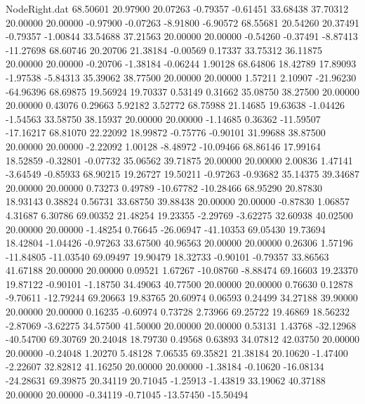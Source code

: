 \begin{filecontents}{NodeRight.dat}
  68.50601   20.97900   20.07263    -0.79357   -0.61451   33.68438   37.70312   20.00000   20.00000   -0.97900   -0.07263   -8.91800   -6.90572
  68.55681   20.54260   20.37491    -0.79357   -1.00844   33.54688   37.21563   20.00000   20.00000   -0.54260   -0.37491   -8.87413  -11.27698
  68.60746   20.20706   21.38184    -0.00569    0.17337   33.75312   36.11875   20.00000   20.00000   -0.20706   -1.38184   -0.06244    1.90128
  68.64806   18.42789   17.89093    -1.97538   -5.84313   35.39062   38.77500   20.00000   20.00000    1.57211    2.10907  -21.96230  -64.96396
  68.69875   19.56924   19.70337     0.53149    0.31662   35.08750   38.27500   20.00000   20.00000    0.43076    0.29663    5.92182    3.52772
  68.75988   21.14685   19.63638    -1.04426   -1.54563   33.58750   38.15937   20.00000   20.00000   -1.14685    0.36362  -11.59507  -17.16217
  68.81070   22.22092   18.99872    -0.75776   -0.90101   31.99688   38.87500   20.00000   20.00000   -2.22092    1.00128   -8.48972  -10.09466
  68.86146   17.99164   18.52859    -0.32801   -0.07732   35.06562   39.71875   20.00000   20.00000    2.00836    1.47141   -3.64549   -0.85933
  68.90215   19.26727   19.50211    -0.97263   -0.93682   35.14375   39.34687   20.00000   20.00000    0.73273    0.49789  -10.67782  -10.28466
  68.95290   20.87830   18.93143     0.38824    0.56731   33.68750   39.88438   20.00000   20.00000   -0.87830    1.06857    4.31687    6.30786
  69.00352   21.48254   19.23355    -2.29769   -3.62275   32.60938   40.02500   20.00000   20.00000   -1.48254    0.76645  -26.06947  -41.10353
  69.05430   19.73694   18.42804    -1.04426   -0.97263   33.67500   40.96563   20.00000   20.00000    0.26306    1.57196  -11.84805  -11.03540
  69.09497   19.90479   18.32733    -0.90101   -0.79357   33.86563   41.67188   20.00000   20.00000    0.09521    1.67267  -10.08760   -8.88474
  69.16603   19.23370   19.87122    -0.90101   -1.18750   34.49063   40.77500   20.00000   20.00000    0.76630    0.12878   -9.70611  -12.79244
  69.20663   19.83765   20.60974     0.06593    0.24499   34.27188   39.90000   20.00000   20.00000    0.16235   -0.60974    0.73728    2.73966
  69.25722   19.46869   18.56232    -2.87069   -3.62275   34.57500   41.50000   20.00000   20.00000    0.53131    1.43768  -32.12968  -40.54700
  69.30769   20.24048   18.79730     0.49568    0.63893   34.07812   42.03750   20.00000   20.00000   -0.24048    1.20270    5.48128    7.06535
  69.35821   21.38184   20.10620    -1.47400   -2.22607   32.82812   41.16250   20.00000   20.00000   -1.38184   -0.10620  -16.08134  -24.28631
  69.39875   20.34119   20.71045    -1.25913   -1.43819   33.19062   40.37188   20.00000   20.00000   -0.34119   -0.71045  -13.57450  -15.50494

\end{filecontents}
